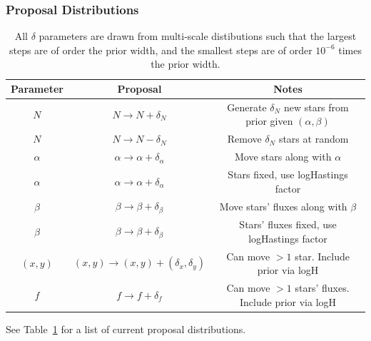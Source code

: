 \documentclass[letterpaper, 11pt]{article}
\begin{document}
\subsubsection{Proposal Distributions}

\begin{table}
\begin{center}
\begin{tabular}{c|c|c}
Parameter & Proposal & Notes\\
\hline
$N$ & $N \to N + \delta_N$ & Generate $\delta_N$ new stars from prior given
$(\alpha, \beta)$\\
$N$ & $N \to N - \delta_N$ & Remove $\delta_N$ stars at random\\
$\alpha$ & $\alpha \to \alpha + \delta_\alpha$ & Move stars along with $\alpha$
\\
$\alpha$ & $\alpha \to \alpha + \delta_\alpha$ & Stars fixed, use logHastings
factor \\
$\beta$ & $\beta \to \beta + \delta_\beta$ & Move stars' fluxes along with
$\beta$\\
$\beta$ & $\beta \to \beta + \delta_\beta$ & Stars' fluxes fixed, use
logHastings factor \\
$(x,y)$ & $(x,y) \to (x,y)+(\delta_x, \delta_y)$ & Can move $>1$ star.
Include prior via logH \\
$f$ & $f \to f + \delta_f$ & Can move $>1$ stars' fluxes. Include prior
via logH
\end{tabular}
\end{center}
\caption{All $\delta$ parameters are drawn from multi-scale distibutions such
that the largest steps are of order the prior width, and the smallest steps
are of order $10^{-6}$ times the prior width.\label{proposals}}
\end{table}

See Table~\ref{proposals} for a list of current proposal distributions.


\end{document}
